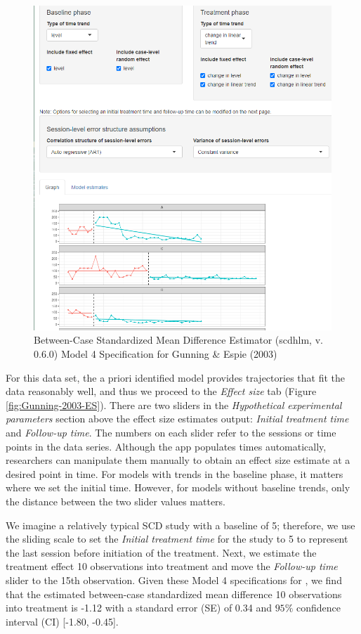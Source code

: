 \documentclass[
]{book}
\begin{document}
\begin{figure}
\includegraphics[width=0.6\linewidth]{images/app.model.model4_GunningEspie2003} \caption{Between-Case Standardized Mean Difference Estimator (scdhlm, v. 0.6.0) Model 4 Specification for Gunning \& Espie (2003)}\label{fig:Gunning-2003-model}
\end{figure}

For this data set, the a priori identified model provides trajectories that fit the data reasonably well, and thus we proceed to the \emph{Effect size} tab (Figure \ref{fig:Gunning-2003-ES}). There are two sliders in the \emph{Hypothetical experimental parameters} section above the effect size estimates output: \emph{Initial treatment time} and \emph{Follow-up time}. The numbers on each slider refer to the sessions or time points in the data series. Although the app populates times automatically, researchers can manipulate them manually to obtain an effect size estimate at a desired point in time. For models with trends in the baseline phase, it matters where we set the initial time. However, for models without baseline trends, only the distance between the two slider values matters.

We imagine a relatively typical SCD study with a baseline of 5; therefore, we use the sliding scale to set the \emph{Initial treatment time} for the \citet{gunning2003Psychological} study to 5 to represent the last session before initiation of the treatment. Next, we estimate the treatment effect 10 observations into treatment and move the \emph{Follow-up time} slider to the 15th observation. Given these Model 4 specifications for \citet{gunning2003Psychological}, we find that the estimated between-case standardized mean difference 10 observations into treatment is -1.12 with a standard error (SE) of 0.34 and \(95\%\) confidence interval (CI) {[}-1.80, -0.45{]}.
\end{document}
